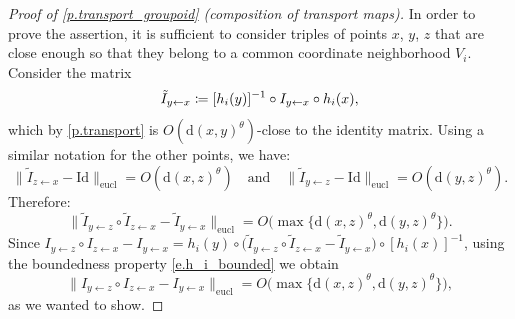 \documentclass[10pt]{amsart}
\def\vcentcolon{\mathrel{\mathop\ordinarycolon}}
\providecommand\ordinarycolon{:}
\providecommand*\coloneqq{\vcentcolon\mathrel{\mkern-1.2mu}=}
\theoremstyle{plain}
\theoremstyle{definition}
\newcommand{\dd}{\mathrm{d}}
\begin{document}
\begin{proof}[Proof of \cref{p.transport_groupoid} (composition of transport maps)]
In order to prove the assertion, it is sufficient to consider triples of points $x$, $y$, $z$ that are close enough so that they belong to a common coordinate neighborhood $V_i$. Consider the matrix
\begin{equation}\label{e.tilde_I}
\tilde I_{y \gets x} \coloneqq [h_i(y)]^{-1} \circ I_{y \gets x} \circ h_i(x),
\end{equation}
which by \cref{p.transport} is $O(\dd(x,y)^\theta)$-close to the identity matrix.
Using a similar notation for the other points, we have:
\[
\| \tilde I_{z \gets x} - \mathrm{Id} \|_\mathrm{eucl} = O(\dd(x,z)^\theta) \quad \text{and} \quad
\| \tilde I_{y \gets z} - \mathrm{Id} \|_\mathrm{eucl} = O(\dd(y,z)^\theta).
\]
Therefore:
\[
\| \tilde I_{y \gets z} \circ \tilde I_{z \gets x} - \tilde I_{y \gets x} \|_\mathrm{eucl} = O \big( \max\{ \dd(x,z)^\theta, \dd(y,z)^\theta \} \big).
\]
Since $I_{y \gets z} \circ I_{z \gets x} - I_{y \gets x} = h_i(y) \circ \big( \tilde I_{y \gets z} \circ \tilde I_{z \gets x} - \tilde I_{y \gets x} \big) \circ [h_i(x)]^{-1}$, using the boundedness property \eqref{e.h_i_bounded} we obtain
\[
\| I_{y \gets z} \circ I_{z \gets x} - I_{y \gets x} \|_\mathrm{eucl} = O \big( \max\{ \dd(x,z)^\theta, \dd(y,z)^\theta \} \big),
\]
as we wanted to show.
\end{proof}
\end{document}
